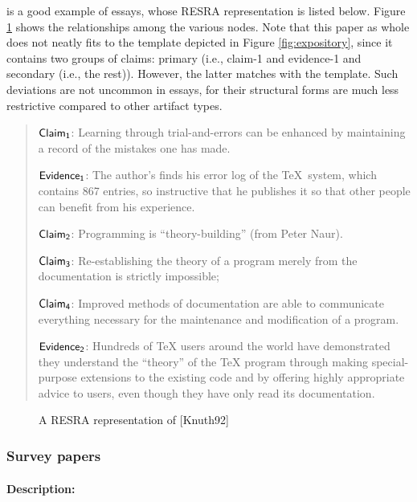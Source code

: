\cite{Knuth92} is a good example of essays, whose RESRA representation is
listed below. Figure \ref{fig:knuth} shows the relationships among the
various nodes. Note that this paper as whole does not neatly fits to the
template depicted in Figure \ref{fig:expository}, since it contains two
groups of claims: primary (i.e., {\sf claim-1\/} and {\sf evidence-1\/} and
secondary (i.e., the rest)). However, the latter matches with the template.
Such deviations are not uncommon in essays, for their structural forms are
much less restrictive compared to other artifact types.

\small
\begin{quotation}
  \noindent \( {\sf Claim_{1}} \): Learning through trial-and-errors can
  be enhanced by maintaining a record of the mistakes one has made.
  
  \noindent\( {\sf Evidence_{1}} \): The author's finds his error log of the
  \TeX\ system, which contains 867 entries, so instructive that he publishes
  it so that other people can benefit from his experience.

  \noindent\( {\sf Claim_{2}\/} \): Programming is ``theory-building'' (from Peter Naur).
  
  \noindent\( {\sf Claim_{3}} \): Re-establishing the theory of a program merely from
  the documentation is strictly impossible;
  
  \noindent\( {\sf Claim_{4}} \): Improved methods of documentation are able to
  communicate everything necessary for the maintenance and modification of
  a program.
  
  \noindent\( {\sf Evidence_{2}} \): Hundreds of \TeX\/ users around the
  world have demonstrated they understand the ``theory'' of the \TeX\/
  program through making special-purpose extensions to the existing code
  and by offering highly appropriate advice to users, even though they
  have only read its documentation.
\end{quotation}
\normalsize

\begin{figure}[htb]
  \caption{A RESRA representation of [Knuth92]}
  \label{fig:knuth}
\end{figure}


\subsubsection{Survey papers}

\paragraph{Description:}

